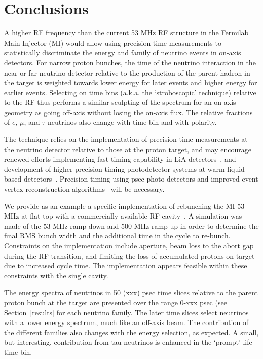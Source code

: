 
%
%
\section{Conclusions}
\label{conclusions}
A higher RF frequency than the current 53 MHz RF structure in the
Fermilab Main Injector (MI) would allow using precision time
measurements to statistically discriminate the energy and family of
neutrino events in on-axis detectors. For narrow proton bunches, the
time of the neutrino interaction in the near or far neutrino detector
relative to the production of the parent hadron in the target is
weighted towards lower energy for later events and higher energy for
earlier events. Selecting on time bins (a.k.a. the `stroboscopic'
technique) relative to the RF thus performs a similar sculpting of the spectrum for an on-axis geometry as going off-axis without losing the on-axis flux. The relative fractions of $e$, $\mu$, and $\tau$
neutrinos also change with time bin and with polarity. 

The technique relies on the implementation of 
precision time measurements at the neutrino
detector relative to those at the proton target, and may encourage 
renewed efforts implementing fast timing capability in LiA
detectors~\cite{LiA_timing}, and development of higher precision timing
photodetector systems at warm liquid-based detectors~\cite{ANNIE, JUNO,liquid_based}. Precision timing using psec
photo-detectors and improved event vertex reconstruction
algorithms~\cite{vertex_reconstruction} will be necessary.

We provide as an example a specific implementation of rebunching the
MI 53 MHz at flat-top with a commercially-available RF 
cavity~\cite{nsls-cavity,cls_stampe}. A simulation was made of the 53 MHz
ramp-down and 500 MHz ramp up in order to determine the final RMS
bunch width and the additional time in the cycle to re-bunch. 
Constraints on the implementation include aperture, beam loss to the
abort gap during the RF transition, and limiting the loss of
accumulated protons-on-target due to increased cycle time. The
implementation  appears feasible within these constraints with the 
single cavity.

The energy spectra of neutrinos in 50 (xxx) psec time slices relative
to the parent proton bunch at the target are presented over the range
0-xxx psec (see Section~\ref{results} for each neutrino family. The
later time slices select neutrinos with a lower energy spectrum, much
like an off-axis beam. The contribution of the different families also
changes with the energy selection, as expected. A small, but
interesting, contribution from tau neutrinos is enhanced in the `prompt' 
life-time bin.


